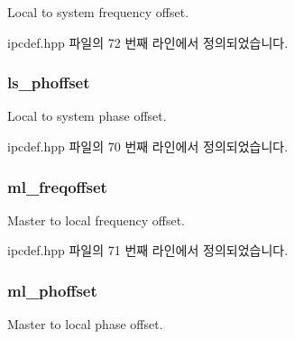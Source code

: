 Local to system frequency offset. 



ipcdef.\+hpp 파일의 72 번째 라인에서 정의되었습니다.

\subsubsection[{\texorpdfstring{ls\+\_\+phoffset}{ls_phoffset}}]{ ls\+\_\+phoffset}\hypertarget{structg_ptp_time_data_a092b9f356daa2757877b51e4084366be}{}\label{structg_ptp_time_data_a092b9f356daa2757877b51e4084366be}


Local to system phase offset. 



ipcdef.\+hpp 파일의 70 번째 라인에서 정의되었습니다.

\subsubsection[{\texorpdfstring{ml\+\_\+freqoffset}{ml_freqoffset}}]{ ml\+\_\+freqoffset}\hypertarget{structg_ptp_time_data_aafeb4d0fa7d3cb53ee3686b804e47617}{}\label{structg_ptp_time_data_aafeb4d0fa7d3cb53ee3686b804e47617}


Master to local frequency offset. 



ipcdef.\+hpp 파일의 71 번째 라인에서 정의되었습니다.

\subsubsection[{\texorpdfstring{ml\+\_\+phoffset}{ml_phoffset}}]{ ml\+\_\+phoffset}\hypertarget{structg_ptp_time_data_a707b32410dd96584191405fcc6b1b10d}{}\label{structg_ptp_time_data_a707b32410dd96584191405fcc6b1b10d}


Master to local phase offset. 



